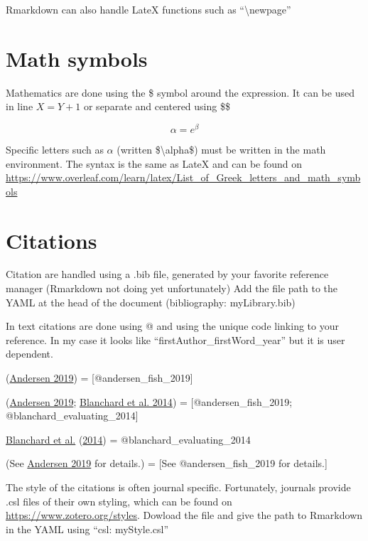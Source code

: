 \documentclass[
  11pt,
]{article}
\begin{document}
Rmarkdown can also handle LateX functions such as ``\textbackslash newpage''

\newpage

\hypertarget{math-symbols}{%
\section{Math symbols}\label{math-symbols}}

Mathematics are done using the \$ symbol around the expression. It can be used in line \(X = Y + 1\) or separate and centered using \$\$

\[\alpha = e{^\beta}\]

Specific letters such as \(\alpha\) (written \$\textbackslash alpha\$) must be written in the math environment. The syntax is the same as LateX and can be found on \url{https://www.overleaf.com/learn/latex/List_of_Greek_letters_and_math_symbols}

\hypertarget{citations}{%
\section{Citations}\label{citations}}

Citation are handled using a .bib file, generated by your favorite reference manager (Rmarkdown not doing yet unfortunately)
Add the file path to the YAML at the head of the document (bibliography: myLibrary.bib)

In text citations are done using @ and using the unique code linking to your reference. In my case it looks like ``firstAuthor\_firstWord\_year'' but it is user dependent.

(\protect\hyperlink{ref-andersen_fish_2019}{Andersen 2019}) = {[}@andersen\_fish\_2019{]}

(\protect\hyperlink{ref-andersen_fish_2019}{Andersen 2019}; \protect\hyperlink{ref-blanchard_evaluating_2014}{Blanchard et al. 2014}) = {[}@andersen\_fish\_2019; @blanchard\_evaluating\_2014{]}

\protect\hyperlink{ref-blanchard_evaluating_2014}{Blanchard et al.} (\protect\hyperlink{ref-blanchard_evaluating_2014}{2014}) = @blanchard\_evaluating\_2014

(See \protect\hyperlink{ref-andersen_fish_2019}{Andersen 2019} for details.) = {[}See @andersen\_fish\_2019 for details.{]}

The style of the citations is often journal specific. Fortunately, journals provide .csl files of their own styling, which can be found on \url{https://www.zotero.org/styles}. Dowload the file and give the path to Rmarkdown in the YAML using ``csl: myStyle.csl''
\end{document}
